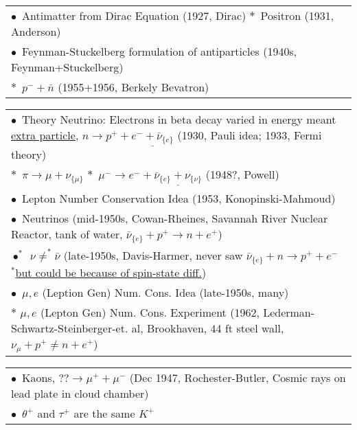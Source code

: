 \documentclass{article}
\begin{document}
\begin{landscape}
\vspace{15pt}
\begin{tabular}[t]{l}
    \(\bullet\)\ Antimatter from Dirac Equation (1927, Dirac) \hspace{15pt} \(\ast\)\ Positron (1931, Anderson) \\
    \(\bullet\)\ Feynman-Stuckelberg formulation of antiparticles (1940s, Feynman+Stuckelberg)\\
    \(\ast\)\ \(p^- + \bar{n}\) (1955+1956, Berkely Bevatron)
\end{tabular}

\vspace{15pt}
\begin{tabular}[t]{l}
    \(\bullet\)\ Theory Neutrino: Electrons in beta decay varied in energy meant \underline{extra particle}, %
        \(n \rightarrow p^+ + \underline{ e^- + \bar{\nu}_{\{e\}} } \) (1930, Pauli idea; 1933, Fermi theory) 
        \\
    \(\ast\)\ \(\pi \rightarrow \mu + \nu_{\{\mu\}}\) %
        \hspace{15pt} \(\ast\)\ \(\mu^- \rightarrow e^- + \underline{ \bar{\nu}_{\{e\}} + \nu_{\{\nu\}} } \) (1948?, Powell)
        \\
    \(\bullet\)\ Lepton Number Conservation Idea (1953, Konopinski-Mahmoud)\\
    \(\bullet\)\ Neutrinos (mid-1950s, Cowan-Rheines, Savannah River Nuclear Reactor, tank of water, %
        \(\bar{\nu}_{\{e\}} + p^+ \rightarrow n + e^+ \))
        \\
    \(\bullet^*\)\ \(\nu \neq^* \bar{\nu}\) (late-1950s, Davis-Harmer, never saw %
        \(\bar{\nu}_{\{e\}} + n \rightarrow p^+ + e^-\) \(^*\)\underline{but could be because of spin-state diff.})\\
    \(\bullet\)\ \(\mu,e\) (Leption Gen) Num. Cons. Idea (late-1950s, many)\\
    \(\ast\) \(\mu,e\) (Lepton Gen) Num. Cons. Experiment (1962, Lederman-Schwartz-Steinberger-et. al, %
        Brookhaven, 44 ft steel wall, \(\nu_\mu + p^+ \neq n + e^+\))
\end{tabular}

\vspace{15pt}
\begin{tabular}[t]{l}
    \(\bullet\)\ Kaons, \(?? \rightarrow \mu^+ + \mu^-\) (Dec 1947, Rochester-Butler, Cosmic rays on lead plate in cloud chamber)\\
    \(\bullet\)\ \(\theta^+\) and \(\tau^+\) are the same \(K^+\)
\end{tabular}


\end{landscape}
\end{document}
